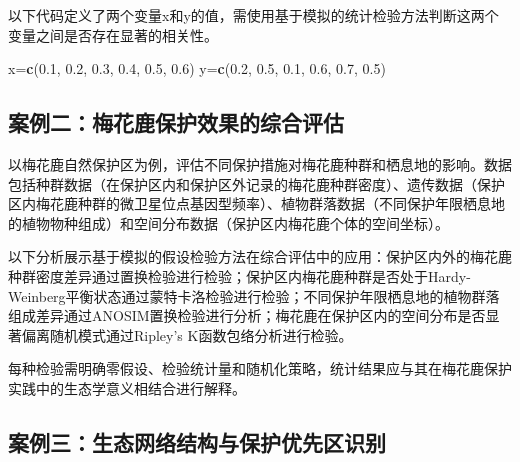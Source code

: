 \documentclass[
  twoside,12pt,fontset=none]{ctexbook}
\newenvironment{Shaded}{\begin{snugshade}}{\end{snugshade}}
\newcommand{\FloatTok}[1]{\textcolor[rgb]{0.00,0.00,0.81}{#1}}
\newcommand{\FunctionTok}[1]{\textcolor[rgb]{0.13,0.29,0.53}{\textbf{#1}}}
\newcommand{\NormalTok}[1]{#1}
\newcommand{\OtherTok}[1]{\textcolor[rgb]{0.56,0.35,0.01}{#1}}
\begin{document}
以下代码定义了两个变量x和y的值，需使用基于模拟的统计检验方法判断这两个变量之间是否存在显著的相关性。

\begin{Shaded}
\begin{Highlighting}[]
\NormalTok{x}\OtherTok{=}\FunctionTok{c}\NormalTok{(}\FloatTok{0.1}\NormalTok{, }\FloatTok{0.2}\NormalTok{, }\FloatTok{0.3}\NormalTok{, }\FloatTok{0.4}\NormalTok{, }\FloatTok{0.5}\NormalTok{, }\FloatTok{0.6}\NormalTok{)}
\NormalTok{y}\OtherTok{=}\FunctionTok{c}\NormalTok{(}\FloatTok{0.2}\NormalTok{, }\FloatTok{0.5}\NormalTok{, }\FloatTok{0.1}\NormalTok{, }\FloatTok{0.6}\NormalTok{, }\FloatTok{0.7}\NormalTok{, }\FloatTok{0.5}\NormalTok{)}
\end{Highlighting}
\end{Shaded}

\hypertarget{ux6848ux4f8bux4e8cux6885ux82b1ux9e7fux4fddux62a4ux6548ux679cux7684ux7efcux5408ux8bc4ux4f30}{%
\subsection{案例二：梅花鹿保护效果的综合评估}\label{ux6848ux4f8bux4e8cux6885ux82b1ux9e7fux4fddux62a4ux6548ux679cux7684ux7efcux5408ux8bc4ux4f30}}

以梅花鹿自然保护区为例，评估不同保护措施对梅花鹿种群和栖息地的影响。数据包括种群数据（在保护区内和保护区外记录的梅花鹿种群密度）、遗传数据（保护区内梅花鹿种群的微卫星位点基因型频率）、植物群落数据（不同保护年限栖息地的植物物种组成）和空间分布数据（保护区内梅花鹿个体的空间坐标）。

以下分析展示基于模拟的假设检验方法在综合评估中的应用：保护区内外的梅花鹿种群密度差异通过置换检验进行检验；保护区内梅花鹿种群是否处于Hardy-Weinberg平衡状态通过蒙特卡洛检验进行检验；不同保护年限栖息地的植物群落组成差异通过ANOSIM置换检验进行分析；梅花鹿在保护区内的空间分布是否显著偏离随机模式通过Ripley's K函数包络分析进行检验。

每种检验需明确零假设、检验统计量和随机化策略，统计结果应与其在梅花鹿保护实践中的生态学意义相结合进行解释。

\hypertarget{ux6848ux4f8bux4e09ux751fux6001ux7f51ux7edcux7ed3ux6784ux4e0eux4fddux62a4ux4f18ux5148ux533aux8bc6ux522b}{%
\subsection{案例三：生态网络结构与保护优先区识别}\label{ux6848ux4f8bux4e09ux751fux6001ux7f51ux7edcux7ed3ux6784ux4e0eux4fddux62a4ux4f18ux5148ux533aux8bc6ux522b}}
\end{document}
